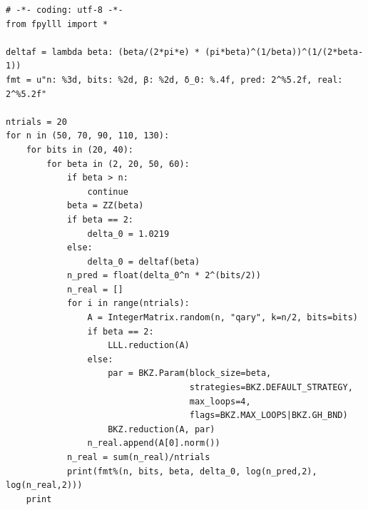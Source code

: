 \documentclass[10pt,a4paper,nobib]{tufte-handout}
\begin{document}
\lstset{language=sage,label= ,caption= ,captionpos=b,numbers=none}
\begin{lstlisting}
# -*- coding: utf-8 -*-
from fpylll import *

deltaf = lambda beta: (beta/(2*pi*e) * (pi*beta)^(1/beta))^(1/(2*beta-1))
fmt = u"n: %3d, bits: %2d, β: %2d, δ_0: %.4f, pred: 2^%5.2f, real: 2^%5.2f"

ntrials = 20
for n in (50, 70, 90, 110, 130):
    for bits in (20, 40):
        for beta in (2, 20, 50, 60):
            if beta > n:
                continue
            beta = ZZ(beta)
            if beta == 2:
                delta_0 = 1.0219
            else:
                delta_0 = deltaf(beta)
            n_pred = float(delta_0^n * 2^(bits/2))
            n_real = []
            for i in range(ntrials):
                A = IntegerMatrix.random(n, "qary", k=n/2, bits=bits)
                if beta == 2:
                    LLL.reduction(A)
                else:
                    par = BKZ.Param(block_size=beta,
                                    strategies=BKZ.DEFAULT_STRATEGY,
                                    max_loops=4,
                                    flags=BKZ.MAX_LOOPS|BKZ.GH_BND)
                    BKZ.reduction(A, par)
                n_real.append(A[0].norm())
            n_real = sum(n_real)/ntrials
            print(fmt%(n, bits, beta, delta_0, log(n_pred,2), log(n_real,2)))
    print
\end{lstlisting}
\end{document}
